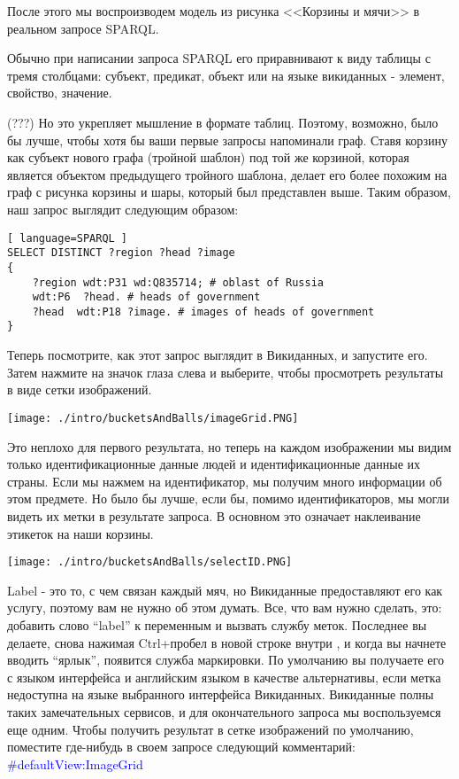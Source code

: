 После этого мы воспроизводем модель из рисунка <<Корзины и мячи>> в реальном запросе SPARQL.

Обычно при написании запроса SPARQL его приравнивают к виду таблицы с тремя столбцами: субъект, предикат, объект или на языке викиданных - элемент, свойство, значение.

(???) Но это укрепляет мышление в формате таблиц. Поэтому, возможно, было бы лучше, чтобы хотя бы ваши первые запросы напоминали граф. Ставя корзину как субъект нового графа (тройной шаблон) под той же корзиной, которая является объектом предыдущего тройного шаблона, делает его более похожим на граф с рисунка корзины и шары, который был представлен выше. Таким образом, наш запрос выглядит следующим образом:

\begin{lstlisting}[ language=SPARQL ]
SELECT DISTINCT ?region ?head ?image
{
    ?region wdt:P31 wd:Q835714; # oblast of Russia
    wdt:P6  ?head. # heads of government
    ?head  wdt:P18 ?image. # images of heads of government
}
\end{lstlisting}

Теперь посмотрите, как этот запрос выглядит в Викиданных, и запустите его. Затем нажмите на значок глаза слева и выберите, чтобы просмотреть результаты в виде сетки изображений.

\begin{figure*}[h!]
\texttt{[image: ./intro/bucketsAndBalls/imageGrid.PNG]}
\end{figure*}

Это неплохо для первого результата, но теперь на каждом изображении мы видим только идентификационные данные людей и идентификационные данные их страны. Если мы нажмем на идентификатор, мы получим много информации об этом предмете. Но было бы лучше, если бы, помимо идентификаторов, мы могли видеть их метки в результате запроса. В основном это означает наклеивание этикеток на наши корзины. 

\begin{figure*}[h!]
\texttt{[image: ./intro/bucketsAndBalls/selectID.PNG]}
\end{figure*}

Label - это то, с чем связан каждый мяч, но Викиданные предоставляют его как услугу, поэтому вам не нужно об этом думать. Все, что вам нужно сделать, это: добавить слово “label” к переменным и вызвать службу меток. Последнее вы делаете, снова нажимая Ctrl+пробел в новой строке внутри {}, и когда вы начнете вводить “ярлык”, появится служба маркировки. По умолчанию вы получаете его с языком интерфейса и английским языком в качестве альтернативы, если метка недоступна на языке выбранного интерфейса Викиданных. Викиданные полны таких замечательных сервисов, и для окончательного запроса мы воспользуемся еще одним. Чтобы получить результат в сетке изображений по умолчанию, поместите где-нибудь в своем запросе следующий комментарий: \textcolor{blue}{\#defaultView:ImageGrid}

